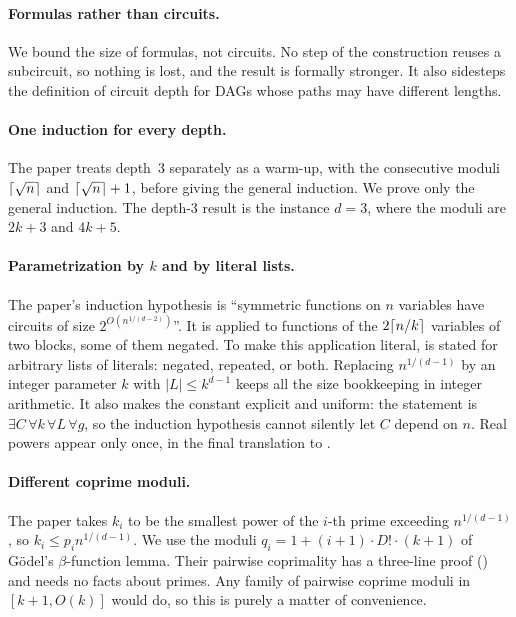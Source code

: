 \documentclass[11pt]{article}
\begin{document}
\paragraph{Formulas rather than circuits.} We bound the size of formulas, not circuits. No step of the construction reuses a subcircuit, so nothing is lost, and the result is formally stronger. It also sidesteps the definition of circuit depth for DAGs whose paths may have different lengths.

\paragraph{One induction for every depth.} The paper treats depth~3 separately as a warm-up, with the consecutive moduli $\lceil\sqrt n\rceil$ and $\lceil\sqrt n\rceil+1$, before giving the general induction. We prove only the general induction. The depth-3 result is the instance $d = 3$, where the moduli are $2k+3$ and $4k+5$.

\paragraph{Parametrization by $k$ and by literal lists.} The paper's induction hypothesis is ``symmetric functions on $n$ variables have circuits of size $2^{O(n^{1/(d-2)})}$''. It is applied to functions of the $2\lceil n/k\rceil$ variables of two blocks, some of them negated. To make this application literal,  is stated for arbitrary lists of literals: negated, repeated, or both. Replacing $n^{1/(d-1)}$ by an integer parameter $k$ with $|L| \le k^{d-1}$ keeps all the size bookkeeping in integer arithmetic. It also makes the constant explicit and uniform: the statement is $\exists C\, \forall k\, \forall L\, \forall g$, so the induction hypothesis cannot silently let $C$ depend on $n$. Real powers appear only once, in the final translation to .

\paragraph{Different coprime moduli.} The paper takes $k_i$ to be the smallest power of the $i$-th prime exceeding $n^{1/(d-1)}$, so $k_i \le p_i n^{1/(d-1)}$. We use the moduli $q_i = 1 + (i+1)\cdot D!\cdot(k+1)$ of G\"odel's $\beta$-function lemma. Their pairwise coprimality has a three-line proof () and needs no facts about primes. Any family of pairwise coprime moduli in $[k+1, O(k)]$ would do, so this is purely a matter of convenience.
\end{document}
